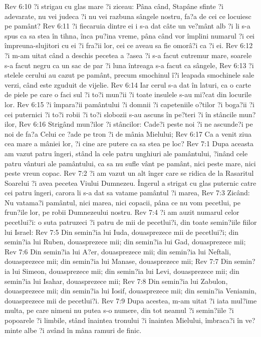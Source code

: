Rev 6:10  ?i strigau cu glas mare ?i ziceau: Pâna când, Stapâne sfinte ?i adevarate, nu vei judeca ?i nu vei razbuna sângele nostru, fa?a de cei ce locuiesc pe pamânt?
Rev 6:11  ?i fiecaruia dintre ei i s-a dat câte un ve?mânt alb ?i li s-a spus ca sa stea în tihna, înca pu?ina vreme, pâna când vor împlini numarul ?i cei împreuna-slujitori cu ei ?i fra?ii lor, cei ce aveau sa fie omorâ?i ca ?i ei.
Rev 6:12  ?i m-am uitat când a deschis pecetea a ?asea ?i s-a facut cutremur mare, soarele s-a facut negru ca un sac de par ?i luna întreaga s-a facut ca sângele,
Rev 6:13  ?i stelele cerului au cazut pe pamânt, precum smochinul î?i leapada smochinele sale verzi, când este zguduit de vijelie.
Rev 6:14  Iar cerul s-a dat în laturi, ca o carte de piele pe care o faci sul ?i to?i mun?ii ?i toate insulele s-au mi?cat din locurile lor.
Rev 6:15  ?i împara?ii pamântului ?i domnii ?i capeteniile o?tilor ?i boga?ii ?i cei puternici ?i to?i robii ?i to?i slobozii s-au ascuns în pe?teri ?i în stâncile mun?ilor,
Rev 6:16  Strigând mun?ilor ?i stâncilor: Cade?i peste noi ?i ne ascunde?i pe noi de fa?a Celui ce ?ade pe tron ?i de mânia Mielului;
Rev 6:17  Ca a venit ziua cea mare a mâniei lor, ?i cine are putere ca sa stea pe loc?
Rev 7:1  Dupa aceasta am vazut patru îngeri, stând la cele patru unghiuri ale pamântului, ?inând cele patru vânturi ale pamântului, ca sa nu sufle vânt pe pamânt, nici peste mare, nici peste vreun copac.
Rev 7:2  ?i am vazut un alt înger care se ridica de la Rasaritul Soarelui ?i avea pecetea Viului Dumnezeu. Îngerul a strigat cu glas puternic catre cei patru îngeri, carora li s-a dat sa vatame pamântul ?i marea,
Rev 7:3  Zicând: Nu vatama?i pamântul, nici marea, nici copacii, pâna ce nu vom pecetlui, pe frun?ile lor, pe robii Dumnezeului nostru.
Rev 7:4  ?i am auzit numarul celor pecetlui?i: o suta patruzeci ?i patru de mii de pecetlui?i, din toate semin?iile fiilor lui Israel:
Rev 7:5  Din semin?ia lui Iuda, douasprezece mii de pecetlui?i; din semin?ia lui Ruben, douasprezece mii; din semin?ia lui Gad, douasprezece mii;
Rev 7:6  Din semin?ia lui A?er, douasprezece mii; din semin?ia lui Neftali, douasprezece mii; din semin?ia lui Manase, douasprezece mii;
Rev 7:7  Din semin?ia lui Simeon, douasprezece mii; din semin?ia lui Levi, douasprezece mii; din semin?ia lui Isahar, douasprezece mii;
Rev 7:8  Din semin?ia lui Zabulon, douasprezece mii; din semin?ia lui Iosif, douasprezece mii; din semin?ia Veniamin, douasprezece mii de pecetlui?i.
Rev 7:9  Dupa acestea, m-am uitat ?i iata mul?ime multa, pe care nimeni nu putea s-o numere, din tot neamul ?i semin?iile ?i popoarele ?i limbile, stând înaintea tronului ?i înaintea Mielului, îmbraca?i în ve?minte albe ?i având în mâna ramuri de finic.
